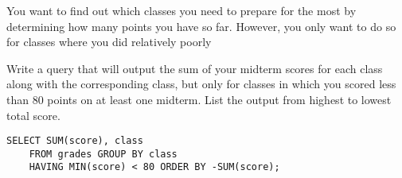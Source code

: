 \begin{blocksection}
\question 
You want to find out which classes you need to prepare for the most by determining how many points you have so far. However, you only want to do so for classes where you did relatively poorly

Write a query that will output the sum of your midterm scores for each class along with the corresponding class, but only for classes in which you scored less than 80 points on at least one midterm. List the output from highest to lowest total score.

\begin{solution}[1.5in]
\begin{lstlisting}
SELECT SUM(score), class
    FROM grades GROUP BY class
    HAVING MIN(score) < 80 ORDER BY -SUM(score);
\end{lstlisting}
\end{solution}
\end{blocksection}